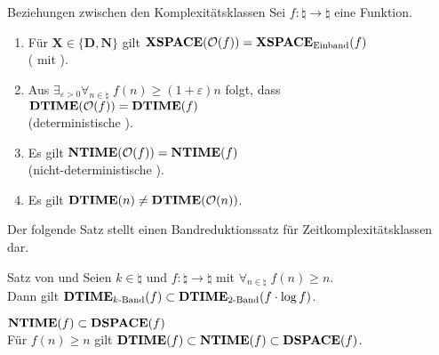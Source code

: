 \begin{Satz}{Beziehungen zwischen den Komplexitätsklassen}
    Sei $f\colon \natural \rightarrow \natural$ eine Funktion.
    \begin{enumerate}
        \item
        Für $\mathbf{X} \in \{\mathbf{D}, \mathbf{N}\}$ gilt
        $\mathbf{XSPACE}(\mathcal{O}(f)) = \mathbf{XSPACE}_{\text{Einband}}(f)$\\
        ( mit ).
        
        \item
        Aus $\exists_{\varepsilon > 0} \forall_{n \in \natural}\; f(n) \ge (1 + \varepsilon) n$
        folgt, dass $\mathbf{DTIME}(\mathcal{O}(f)) = \mathbf{DTIME}(f)$\\
        (deterministische ).
        
        \item
        Es gilt $\mathbf{NTIME}(\mathcal{O}(f)) = \mathbf{NTIME}(f)$\\
        (nicht-deterministische ).
        
        \item
        Es gilt $\mathbf{DTIME}(n) \not= \mathbf{DTIME}(\mathcal{O}(n))$.
    \end{enumerate}
\end{Satz}

\linie

\begin{Bem}
    Der folgende Satz stellt einen Bandreduktionssatz für Zeitkomplexitätsklassen dar.
\end{Bem}

\begin{Satz}{Satz von  und }
    Seien $k \in \natural$ und $f\colon \natural \rightarrow \natural$ mit
    $\forall_{n \in \natural}\; f(n) \ge n$.\\
    Dann gilt $\mathbf{DTIME}_{k\text{-Band}}(f) \subset \mathbf{DTIME}_{2\text{-Band}}(f \cdot \log f)$.
\end{Satz}

\linie
\pagebreak

\begin{Satz}{$\mathbf{NTIME}(f) \subset \mathbf{DSPACE}(f)$}\\
    Für $f(n) \ge n$ gilt $\mathbf{DTIME}(f) \subset \mathbf{NTIME}(f) \subset \mathbf{DSPACE}(f)$.
\end{Satz}

